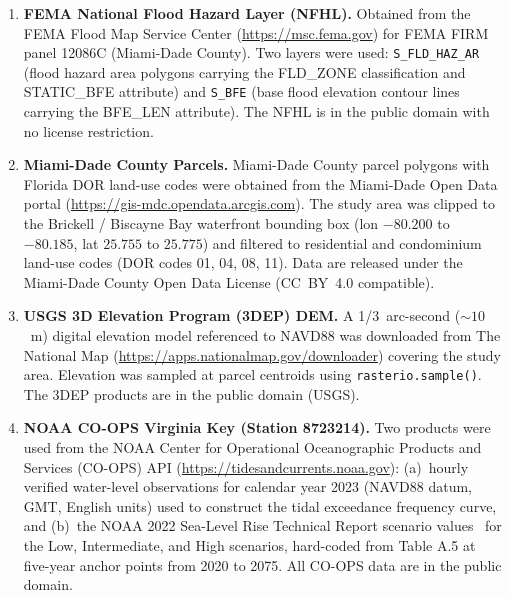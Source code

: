 \documentclass[conference]{IEEEtran}
\begin{document}
\begin{enumerate}

\item \textbf{FEMA National Flood Hazard Layer (NFHL).}
  Obtained from the FEMA Flood Map Service Center
  (\url{https://msc.fema.gov}) for FEMA FIRM panel 12086C
  (Miami-Dade County).
  Two layers were used: \texttt{S\_FLD\_HAZ\_AR} (flood hazard area
  polygons carrying the FLD\_ZONE classification and STATIC\_BFE
  attribute) and \texttt{S\_BFE} (base flood elevation contour lines
  carrying the BFE\_LEN attribute).
  The NFHL is in the public domain with no license restriction.

\item \textbf{Miami-Dade County Parcels.}
  Miami-Dade County parcel polygons with Florida DOR land-use codes
  were obtained from the Miami-Dade Open Data portal
  (\url{https://gis-mdc.opendata.arcgis.com}).
  The study area was clipped to the Brickell / Biscayne Bay waterfront
  bounding box (lon $-80.200$ to $-80.185$, lat $25.755$ to $25.775$)
  and filtered to residential and condominium land-use codes
  (DOR codes 01, 04, 08, 11).
  Data are released under the Miami-Dade County Open Data License
  (CC~BY~4.0 compatible).

\item \textbf{USGS 3D Elevation Program (3DEP) DEM.}
  A 1/3~arc-second (${\sim}10$~m) digital elevation model referenced to
  NAVD88 was downloaded from The National Map
  (\url{https://apps.nationalmap.gov/downloader}) covering the study area.
  Elevation was sampled at parcel centroids using \texttt{rasterio.sample()}.
  The 3DEP products are in the public domain (USGS).

\item \textbf{NOAA CO-OPS Virginia Key (Station 8723214).}
  Two products were used from the NOAA Center for Operational
  Oceanographic Products and Services (CO-OPS) API
  (\url{https://tidesandcurrents.noaa.gov}):
  (a)~hourly verified water-level observations for calendar year 2023
  (NAVD88 datum, GMT, English units) used to construct the tidal
  exceedance frequency curve, and
  (b)~the NOAA 2022 Sea-Level Rise Technical Report scenario
  values~\cite{sweet2022} for the Low, Intermediate, and High scenarios,
  hard-coded from Table A.5 at five-year anchor points from 2020 to 2075.
  All CO-OPS data are in the public domain.

\end{enumerate}


\end{document}
